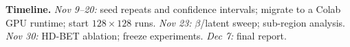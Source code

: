 \documentclass{article}
\begin{document}
\textbf{Timeline.}
\emph{Nov 9--20:} seed repeats and confidence intervals; migrate to a Colab GPU
runtime; start $128\times128$ runs. \emph{Nov 23:} $\beta$/latent sweep;
sub-region analysis. \emph{Nov 30:} HD-BET ablation; freeze experiments.
\emph{Dec 7:} final report.

\clearpage


\end{document}
